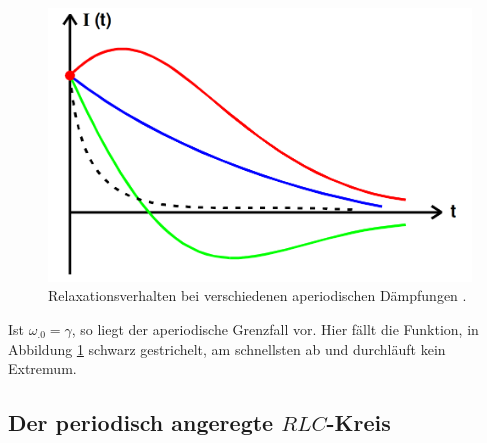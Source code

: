 \begin{figure}
\centering
\includegraphics[width=\linewidth-200pt,height=\textheight-200pt,keepaspectratio]{content/images/daempfungen.png}
\caption{Relaxationsverhalten bei verschiedenen aperiodischen Dämpfungen \cite{V354}.}
\label{fig:Daempfungen}
\end{figure}

\noindent Ist $\omega_.0=\gamma$, so liegt der aperiodische Grenzfall vor. Hier fällt die Funktion, in Abbildung \ref{fig:Daempfungen} schwarz gestrichelt, am schnellsten ab und durchläuft kein Extremum.  

\subsection{Der periodisch angeregte $RLC$-Kreis}

